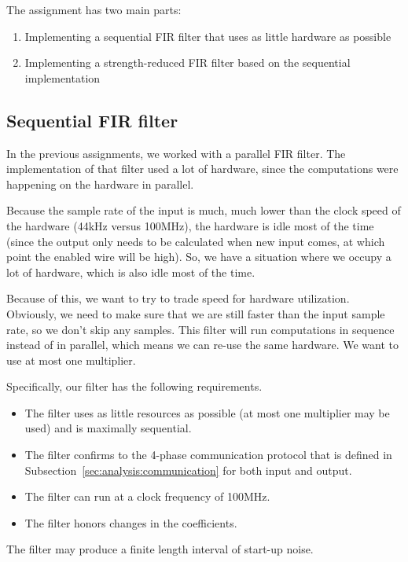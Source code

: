 
The assignment has two main parts:
\begin{enumerate}
	\item Implementing a sequential FIR filter that uses as little hardware as possible
	\item Implementing a strength-reduced FIR filter based on the sequential implementation
\end{enumerate}

\subsection{Sequential FIR filter}
In the previous assignments, we worked with a parallel FIR filter.
The implementation of that filter used a lot of hardware, since the computations were happening on the hardware in parallel.

Because the sample rate of the input is much, much lower than the clock speed of the hardware (44kHz versus 100MHz), the hardware is idle most of the time (since the output only needs to be calculated when new input comes, at which point the enabled wire will be high).
So, we have a situation where we occupy a lot of hardware, which is also idle most of the time.

Because of this, we want to try to trade speed for hardware utilization.
Obviously, we need to make sure that we are still faster than the input sample rate, so we don't skip any samples.
This filter will run computations in sequence instead of in parallel, which means we can re-use the same hardware.
We want to use at most one multiplier.

Specifically, our filter has the following requirements.

\begin{itemize}
	\item The filter uses as little resources as possible (at most one multiplier may be used) and is maximally sequential.
	\item The filter confirms to the 4-phase communication protocol that is defined in Subsection~\ref{sec:analysis:communication} for both input and output.
	\item The filter can run at a clock frequency of 100MHz.
	\item The filter honors changes in the coefficients.
\end{itemize}

The filter may produce a finite length interval of start-up noise.

